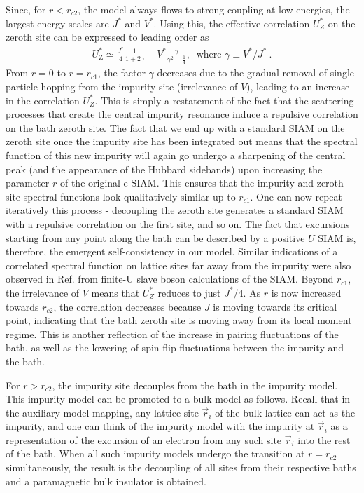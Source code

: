 \documentclass{iopart}
\begin{document}
Since, for \(r < r_{c2}\), the model always flows to strong coupling at low energies, the largest energy scales are \(J^*\) and \(V^*\). Using this, the effective correlation \(U_Z^*\) on the zeroth site can be expressed to leading order as
\begin{eqnarray}
	\label{new-imp-correlation}
	U_\text{Z}^* \simeq \frac{J^*}{4}\frac{1}{1 + 2\gamma} - V^* \frac{\gamma}{\gamma^2 - \frac{1}{4}},~ \text{ where }\gamma\equiv V^*/J^*~.
\end{eqnarray}
From \(r = 0\) to \(r = r_{c1}\), the factor \(\gamma\) decreases due to the gradual removal of single-particle hopping from the impurity site (irrelevance of \(V\)), leading to an increase in the correlation \(U_Z^*\). This is simply a restatement of the fact that the scattering processes that create the central impurity resonance induce a repulsive correlation on the bath zeroth site. The fact that we end up with a standard SIAM on the zeroth site once the impurity site has been integrated out means that the spectral function of this new impurity will again go undergo a sharpening of the central peak (and the appearance of the Hubbard sidebands) upon increasing the parameter $r$ of the original e-SIAM. This ensures that the impurity and zeroth site spectral functions look qualitatively similar up to \(r_{c1}\). One can now repeat iteratively this process - decoupling the zeroth site generates a standard SIAM with a repulsive correlation on the first site, and so on. The fact that excursions starting from any point along the bath can be described by a positive \(U\) SIAM is, therefore, the emergent self-consistency in our model. Similar indications of a correlated spectral function on lattice sites far away from the impurity were also observed in Ref.\cite{martin2019} from finite-U slave boson calculations of the SIAM. Beyond \(r_{c1}\), the irrelevance of \(V\) means that \(U_Z^*\) reduces to just \(J^*/4\). As \(r\) is now increased towards \(r_{c2}\), the correlation decreases because \(J\) is moving towards its critical point, indicating that the bath zeroth site is moving away from its local moment regime. This is another reflection of the increase in pairing fluctuations of the bath, as well as the lowering of spin-flip fluctuations between the impurity and the bath.

For \(r > r_{c2}\), the impurity site decouples from the bath in the impurity model. This impurity model can be promoted to a bulk model as follows. Recall that in the auxiliary model mapping, any lattice site \(\vec r_i\) of the bulk lattice can act as the impurity, and one can think of the impurity model with the impurity at \(\vec r_i\) as a representation of the excursion of an electron from any such site \(\vec r_i\) into the rest of the bath. When all such impurity models undergo the transition at \(r = r_{c2}\) simultaneously, the result is the decoupling of all sites from their respective baths and a paramagnetic bulk insulator is obtained.
\end{document}
